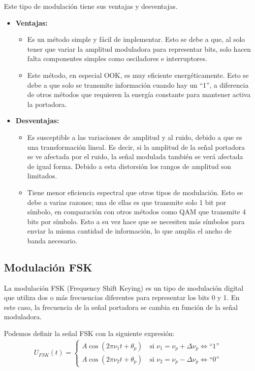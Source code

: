 \documentclass[12pt, letterpaper]{article}
\begin{document}
\newpage
Este tipo de modulación tiene sus ventajas y desventajas.
\begin{itemize}
    \item \textbf{Ventajas:}
    \begin{itemize}
        \item Es un método simple y fácil de implementar. Esto se debe a que, al solo tener que variar la amplitud moduladora para representar bits, solo hacen falta componentes simples como osciladores e interruptores. 
        \item Este método, en especial OOK, es muy eficiente  energéticamente. Esto se debe a que solo se transmite información cuando hay un ``1'', a diferencia de otros métodos que requieren la energía constante para mantener activa la portadora.
    \end{itemize}

    \item \textbf{Desventajas:}
    \begin{itemize}
        \item Es susceptible a las variaciones de amplitud y al ruido, debido a que es una transformación lineal. Es decir, si la amplitud de la señal portadora se ve afectada por el ruido, la señal modulada también se verá afectada de igual forma. Debido a esta distorsión los rangos de amplitud son limitados.
        \item Tiene menor eficiencia espectral que otros tipos de modulación. Esto se debe a varias razones; una de ellas es que transmite solo 1 bit por símbolo, en comparación con otros métodos como QAM que transmite 4 bits por símbolo. Esto a su vez hace que se necesiten más símbolos para enviar la misma cantidad de información, lo que amplia el ancho de banda necesario.
    \end{itemize}
\end{itemize}

\subsection{Modulación FSK}
La modulación FSK (Frequency Shift Keying) es un tipo de modulación digital que utiliza dos o más frecuencias diferentes para representar los bits 0 y 1. En este caso, la frecuencia de la señal portadora se cambia en función de la señal moduladora.

Podemos definir la señal FSK con la siguiente expresión:
\begin{align}
    U_{FSK}(t) =
    \left\{
    \begin{array}{l}
        A \cos(2\pi\nu_1 t + \theta_p) \quad 
        \text{si } \nu_1 = \nu_p + \Delta\nu_p \Leftrightarrow \text{``1''} \\
        A \cos(2\pi\nu_2 t + \theta_p) \quad
        \text{si } \nu_2 = \nu_p - \Delta\nu_p \Leftrightarrow \text{``0''}
    \end{array}
    \right. \label{eq:fsk}
\end{align}
\end{document}
